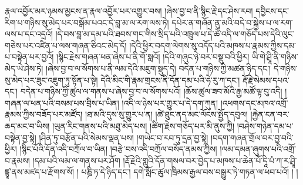 རྣལ་འབྱོར་མར་ཉམས་མྱངས་ན་རྣལ་འབྱོར་པར་འགྱུར་བས། །ཞེས་བྱ་བ་ནི་སྙིང་རྗེ་དང་ཤེས་རབ། དབྱིངས་དང་རིག་པ་གཉིས་སུ་མེད་པར་བསྒོམ་པའང་དེ་བླ་མ་ལ་རག་ལས་ཏེ། དཔེར་ན་གཞོན་ནུ་མའི་བདེ་བ་སྐྱེས་པ་ལ་རག་ལས་པ་དང་འདྲའོ། །དེ་བས་བླ་མ་དམ་པའི་ཐབས་གང་གིས་སྲིད་པའི་འཁྲུལ་པ་དེ་ཚེ་འདི་ལ་གཅོད་པས་དེའི་ལུང་གཅེས་པར་འཛིན་པ་ལས་གཞན་ཅིའང་མེད་དོ། །དེའི་ཕྱིར་བདག་ལེགས་སུ་འདོད་པའི་མཁས་པ་རྣམས་ཀྱིས་དམ་པ་བསྟེན་པར་བྱའོ། །སྙིང་རྗེས་གཞན་ཕན་ཞེས་པ་ནི་གོ་སླའོ། །དེའི་གཞུང་ཉེ་བར་བསྡུ་བའི་ཕྱིར། ཡི་གེ་ཤྲཱི་ནི་གཉིས་མེད་ཡེ་ཤེས་ཏེ། །ཞེས་བྱ་བ་ལ་སོགས་པ་ནི་ལམ་དེའི་མཇུག་སྡུད་དེ། བདེན་པ་གཉིས་ཀྱི་མཚན་ཉིད་དང་། དེ་གཉིས་སུ་མེད་པར་ཟུང་འཇུག་ཏུ་སྟོན་པ་སྟེ། དེའི་མིང་གི་རྣམ་གྲངས་ནི་དོན་དམ་པའི་ཧེ་རུ་ཀ་དང་། རྡོ་རྗེ་སེམས་དཔའ་དང་། བདེན་པ་གཉིས་ཀྱི་ཚུལ་ལ་གནས་པ་ཞེས་བྱ་བ་ལ་སོགས་པའོ། །ཆོས་ཚུལ་ཟབ་མོའི་རྒྱ་མཚོ་ལྟ་བུ་འདི། །གཞན་ལ་ཕན་པའི་བསམ་པས་བྲིས་པ་ཡིན། །འདི་ལ་ཉེས་པར་གྱུར་པ་དེ་དག་ཀུན། །འཕགས་དང་མཁའ་འགྲོ་རྣམས་ཀྱིས་བཟོད་པར་མཛོད། །ཐ་མའི་དུས་སུ་གྱུར་པ་ན། །ཚེ་ཐུང་ནད་མང་ལོངས་སྤྱོད་དབུལ། །རྐྱེན་ངན་བར་ཆད་མང་བ་ཡིས། །ཡུན་རིང་གནས་པའི་མཐུ་མེད་པས། །ཚིག་རྗེས་གཅོད་པར་མི་ནུས་ཀྱི། །བཤེས་གཉེན་དམ་པ་བསྟེན་བྱ་སྟེ། །ཤིན་ཏུ་བརྩོན་པའི་སེམས་ལྡན་པས། །གཡེང་བ་རབ་ཏུ་དྲན་བྱ་སྟེ། །བདག་གཞན་གྲོལ་བར་བྱ་བའི་ཕྱིར། །སྙིང་པོའི་དོན་འདི་བཀྲོལ་བ་ཡིན། །བརྩེ་བས་འདི་བཀྲོལ་བསོད་ནམས་ཀྱིས། །ལམ་དམན་ཞུགས་པའི་འགྲོ་བ་རྣམས། །དམ་པའི་ལམ་ལ་གནས་པར་ཤོག །རྡོ་རྗེའི་གླུའི་དོན་གསལ་བར་བྱེད་པ་མཁས་པ་ཆེན་པོ་དཱི་པཾ་ཀ་ར་ཤྲཱི་ཛྙཱ་ནས་མཛད་པ་རྫོགས་སོ། །
པཎྜི་ཏ་དེ་ཉིད་དང་། དགེ་སློང་ཚུལ་ཁྲིམས་རྒྱལ་བས་བསྒྱུར་ཏེ་གཏན་ལ་ཕབ་པའོ། ། །
